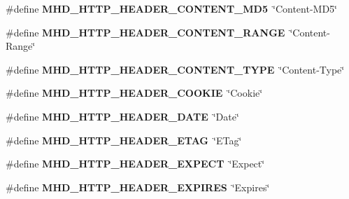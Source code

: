\begin{DoxyCompactItemize}
\item 
\hypertarget{group__headers_ga5de87fc5d4404cf1b3663fef6538cb7b}{\#define {\bfseries \-M\-H\-D\-\_\-\-H\-T\-T\-P\-\_\-\-H\-E\-A\-D\-E\-R\-\_\-\-C\-O\-N\-T\-E\-N\-T\-\_\-\-M\-D5}~\char`\"{}\-Content-\/\-M\-D5\char`\"{}}\label{group__headers_ga5de87fc5d4404cf1b3663fef6538cb7b}

\item 
\hypertarget{group__headers_gab05e48a718beb9428d8480d1dce2604c}{\#define {\bfseries \-M\-H\-D\-\_\-\-H\-T\-T\-P\-\_\-\-H\-E\-A\-D\-E\-R\-\_\-\-C\-O\-N\-T\-E\-N\-T\-\_\-\-R\-A\-N\-G\-E}~\char`\"{}\-Content-\/\-Range\char`\"{}}\label{group__headers_gab05e48a718beb9428d8480d1dce2604c}

\item 
\hypertarget{group__headers_ga9b7a25f23fed192e86293bbc23e04ec7}{\#define {\bfseries \-M\-H\-D\-\_\-\-H\-T\-T\-P\-\_\-\-H\-E\-A\-D\-E\-R\-\_\-\-C\-O\-N\-T\-E\-N\-T\-\_\-\-T\-Y\-P\-E}~\char`\"{}\-Content-\/\-Type\char`\"{}}\label{group__headers_ga9b7a25f23fed192e86293bbc23e04ec7}

\item 
\hypertarget{group__headers_ga64adc901ffa9c8ec140e89a9c7ca90db}{\#define {\bfseries \-M\-H\-D\-\_\-\-H\-T\-T\-P\-\_\-\-H\-E\-A\-D\-E\-R\-\_\-\-C\-O\-O\-K\-I\-E}~\char`\"{}\-Cookie\char`\"{}}\label{group__headers_ga64adc901ffa9c8ec140e89a9c7ca90db}

\item 
\hypertarget{group__headers_ga3b07fe976bd9d6be388c1daa289f051b}{\#define {\bfseries \-M\-H\-D\-\_\-\-H\-T\-T\-P\-\_\-\-H\-E\-A\-D\-E\-R\-\_\-\-D\-A\-T\-E}~\char`\"{}\-Date\char`\"{}}\label{group__headers_ga3b07fe976bd9d6be388c1daa289f051b}

\item 
\hypertarget{group__headers_ga97a92ad4cbd3e8e59fcd8c560c4191c5}{\#define {\bfseries \-M\-H\-D\-\_\-\-H\-T\-T\-P\-\_\-\-H\-E\-A\-D\-E\-R\-\_\-\-E\-T\-A\-G}~\char`\"{}\-E\-Tag\char`\"{}}\label{group__headers_ga97a92ad4cbd3e8e59fcd8c560c4191c5}

\item 
\hypertarget{group__headers_ga9e0c5f9a84a2239b06becf52c0067c52}{\#define {\bfseries \-M\-H\-D\-\_\-\-H\-T\-T\-P\-\_\-\-H\-E\-A\-D\-E\-R\-\_\-\-E\-X\-P\-E\-C\-T}~\char`\"{}\-Expect\char`\"{}}\label{group__headers_ga9e0c5f9a84a2239b06becf52c0067c52}

\item 
\hypertarget{group__headers_gae4b29af22692afa5331f79d26b5e4e2b}{\#define {\bfseries \-M\-H\-D\-\_\-\-H\-T\-T\-P\-\_\-\-H\-E\-A\-D\-E\-R\-\_\-\-E\-X\-P\-I\-R\-E\-S}~\char`\"{}\-Expires\char`\"{}}\label{group__headers_gae4b29af22692afa5331f79d26b5e4e2b}


\end{DoxyCompactItemize}
